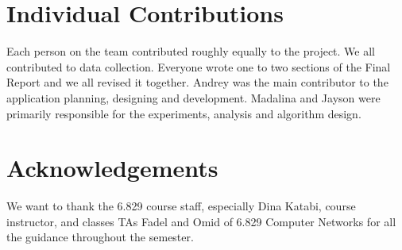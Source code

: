 \documentclass[11pt]{article}
\begin{document}
\section{Individual Contributions}
Each person on the team contributed roughly equally to the project. We all contributed to data collection. Everyone wrote one to two sections of the Final Report and we all revised it together.
Andrey was the main contributor to the application planning, designing and development. Madalina and Jayson were primarily responsible for the experiments, analysis and algorithm design.
\section{Acknowledgements}
We want to thank the 6.829 course staff, especially Dina Katabi, course instructor, and classes TAs Fadel and Omid of 6.829 Computer Networks for all the guidance throughout the semester.

{}
\appendix
\end{document}
